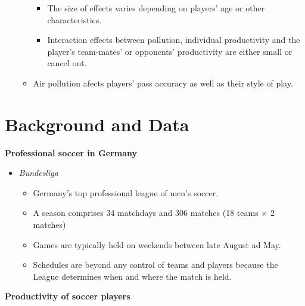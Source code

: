 \documentclass[../root]{subfiles}
\begin{document}
\begin{itemize}
\begin{itemize}
        \begin{itemize}
          \item The size of effects varies depending on players' age or other characteristics.
          \item Interaction effects between pollution, individual productivity and the player’s team-mates’ or opponents’ productivity are either small or cancel out.
        \end{itemize}
        \item Air pollution afects players' pass accuracy as well as their style of play.
      \end{itemize}
    \end{itemize}

    \section{Background and Data}

    \textbf{Professional soccer in Germany}

    \begin{itemize}
      \item \textit{Bundesliga}
      \begin{itemize}
        \item Germany's top professional league of men's soccer.
        \item A season comprises 34 matchdays and 306 matches (18 teams $\times$ 2 matches)
        \item Games are typically held on weekends between late August ad May.
        \item Schedules are beyond any control of teams and players because the League determines when and where the match is held.
      \end{itemize}
    \end{itemize}

    \textbf{Productivity of soccer players}
\end{document}
